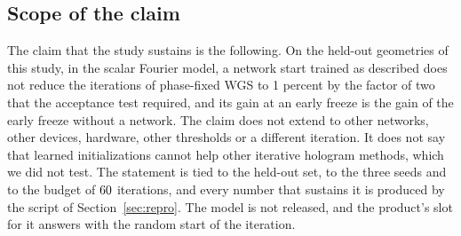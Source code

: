 \subsection{Scope of the claim}\label{sec:scope}

The claim that the study sustains is the following. On the held-out geometries of this study, in the scalar Fourier model, a network start trained as described does not reduce the iterations of phase-fixed WGS to 1 percent by the factor of two that the acceptance test required, and its gain at an early freeze is the gain of the early freeze without a network. The claim does not extend to other networks, other devices, hardware, other thresholds or a different iteration. It does not say that learned initializations cannot help other iterative hologram methods, which we did not test. The statement is tied to the held-out set, to the three seeds and to the budget of $60$ iterations, and every number that sustains it is produced by the script of Section~\ref{sec:repro}. The model is not released, and the product's slot for it answers with the random start of the iteration.
